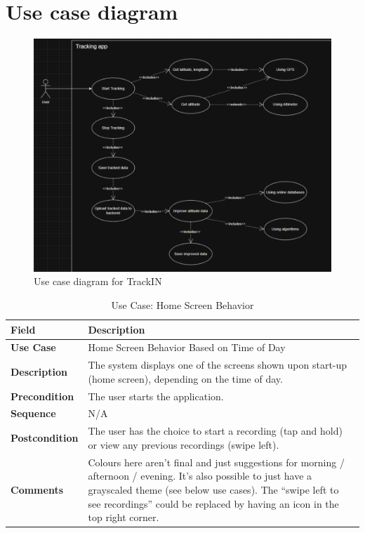 \documentclass[12pt]{article}
\begin{document}
\section{Use case diagram}
\begin{figure}[h!]
    \centering
    \includegraphics[width=\textwidth]{Project_Screenshots/usecase.png}
    \caption{Use case diagram for TrackIN}
\end{figure}

\begin{table}[h!]
\centering
\begin{tabular}{|p{3cm}|p{11cm}|}
\hline
\textbf{Field} & \textbf{Description} \\
\hline
\textbf{Use Case}   & Home Screen Behavior Based on Time of Day \\
\hline
\textbf{Description} & The system displays one of the screens shown upon start-up (home screen), depending on the time of day. \\
\hline
\textbf{Precondition} & The user starts the application. \\
\hline
\textbf{Sequence} & N/A \\
\hline
\textbf{Postcondition} & The user has the choice to start a recording (tap and hold) or view any previous recordings (swipe left). \\
\hline
\textbf{Comments} & Colours here aren’t final and just suggestions for morning / afternoon / evening. It’s also possible to just have a grayscaled theme (see below use cases). The “swipe left to see recordings” could be replaced by having an icon in the top right corner. \\
\hline
\end{tabular}
\caption{Use Case: Home Screen Behavior}
\end{table}
\end{document}

